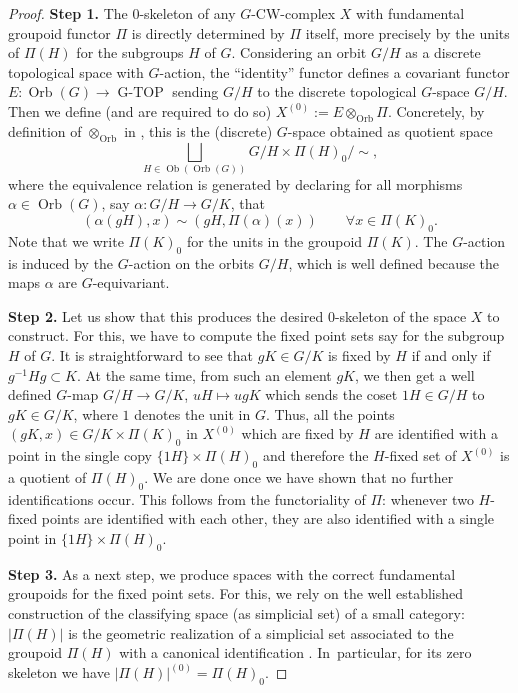 \documentclass[pdftex]{sigma}
\numberwithin{equation}{section}
\newcommand{\bigdisjointunion}{\bigsqcup}
\DeclareMathOperator{\Orb}{Orb}
\DeclareMathOperator{\GTOP}{G-TOP}
\begin{document}
\begin{proof}
\textbf{Step 1.} The 0-skeleton of any $G$-CW-complex $X$ with fundamental
		groupoid functor $\Pi$ is directly determined by $\Pi$ itself, more precisely by the units of
		$\Pi(H)$ for the subgroups $H$ of $G$. Considering an orbit $G/H$ as a discrete
		topological space with $G$-action, the ``identity'' functor defines a covariant functor
		$E\colon \Orb(G)\to \GTOP$ sending $G/H$ to the discrete topological $G$-space $G/H$. Then we
		define (and are required to do so)
$X^{(0)}:= E\otimes_{\Orb}\Pi$.
		Concretely, by definition of $\otimes_{\Orb}$ in \cite{DavisLueck}, this is the (discrete) $G$-space obtained as quotient space
		\begin{equation}\label{eq:glue_X0}
			\bigdisjointunion_{H\in \operatorname{Ob}(\Orb(G))} G/H\times \Pi(H)_0 /{\sim},
		\end{equation}
		where the equivalence relation is generated by declaring for all morphisms
		$\alpha\in \Orb(G)$, say $\alpha\colon G/H\to G/K$, that
		\begin{equation*}
			(\alpha(gH), x) \sim (gH,\Pi(\alpha)(x))\qquad\forall x\in \Pi(K)_0.
		\end{equation*}
		Note that we write $\Pi(K)_0$ for the units in the groupoid $\Pi(K)$. The
		$G$-action is induced by the $G$-action on the orbits $G/H$, which is well
		defined because the maps $\alpha$ are $G$-equivariant.
		
\textbf{Step 2.} Let us show that this produces the desired $0$-skeleton of the space $X$ to construct. For this, we have
		to compute the fixed point sets say for the subgroup $H$ of $G$. It is
		straightforward to see that $gK\in G/K$ is fixed by $H$ if and only if
		$g^{-1}Hg\subset K$. At the same time, from such an element $gK$, we then get a well defined $G$-map
$G/H \to G/K$, $uH \mapsto ugK$
		which sends the coset $1H\in G/H$ to $gK\in G/K$, where $1$ denotes the unit in $G$. Thus, all the points~${(gK,x)\in G/K\times \Pi(K)_0}$ in $X^{(0)}$ which are fixed by $H$ are
		identified with a point in the single
		copy $\{1H\}\times \Pi(H)_0$ and therefore the $H$-fixed set of $X^{(0)}$ is
		a quotient of $\Pi(H)_0$. We are done once we have shown that no further
		identifications occur. This follows from the functoriality of $\Pi$:
		whenever two $H$-fixed points are identified with each other, they are also
		identified with a single point in $\{1H\}\times \Pi(H)_0$.
		
\textbf{Step 3.} As a next step, we produce spaces with the correct fundamental groupoids for
		the fixed point sets. For this, we rely on the well established
		construction of the classifying space (as simplicial set) of a small
		category: $|\Pi(H)|$ is the geometric realization of a simplicial set
		associated to the groupoid $\Pi(H)$ with a canonical
		identification . In~particular,
		for its zero skeleton we have $|\Pi(H)|^{(0)}=\Pi(H)_0$.
		

\end{proof}
\end{document}
